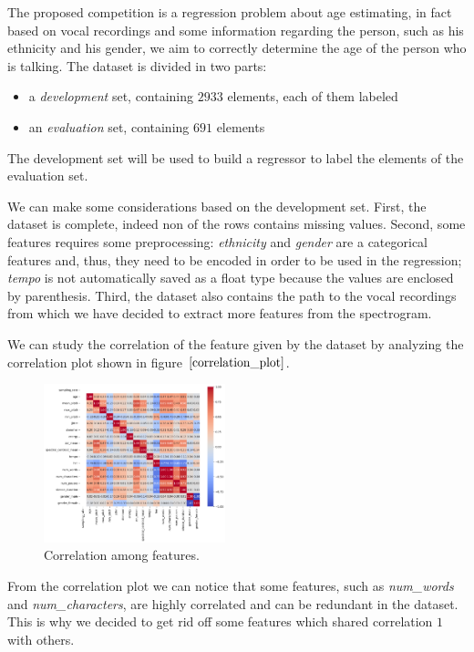 The proposed competition is a regression problem about age estimating, in fact based on vocal recordings and some information regarding the person, such as his ethnicity and his gender, we aim to correctly determine the age of the person who is talking.
The dataset is divided in two parts:
\begin{itemize}
    \item a \emph{development} set, containing $2933$ elements, each of them labeled  
    \item an \emph{evaluation} set, containing $691$ elements
\end{itemize}
The development set will be used to build a regressor to label the elements of the evaluation set.

We can make some considerations based on the development set. First, the dataset is complete, indeed non of the rows contains missing values. 
Second, some features requires some preprocessing: \emph{ethnicity} and \emph{gender} are a categorical features and, thus, they need to be encoded in order to be used in the regression; \emph{tempo} is not automatically saved as a float type because the values are enclosed by parenthesis.
Third, the dataset also contains the path to the vocal recordings from which we have decided to extract more features from the spectrogram.

We can study the correlation of the feature given by the dataset by analyzing the correlation plot shown in figure $\eqref{correlation_plot}$.
\begin{figure}
    \includegraphics[width = 0.47\textwidth]{img/correlation_plot.png}
    \caption{Correlation among features.}
    \label{correlation_plot}
\end{figure}
From the correlation plot we can notice that some features, such as \textit{num\_words} and \textit{num\_characters}, are highly correlated and can be redundant in the dataset. This is why we decided to get rid off some features which shared correlation $1$ with others. 

